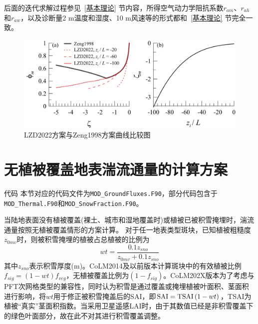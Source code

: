 后面的迭代求解过程参见~\ref{基本理论} 节内容，所得空气动力学阻抗系数$r_{am}$、$r_{ah}$和$r_{aw}$，以及诊断量2 m温度和湿度、10 m风速等的形式都和~\ref{基本理论} 节完全一致。
{
\begin{figure}[htbp]
\centering
\includegraphics[scale=0.7]{Figures/地表湍流交换过程/LZD2022方案与Zeng1998方案曲线比较图.png}
\caption{LZD2022方案与Zeng1998方案曲线比较图}
\label{fig:LZD2022方案与Zeng1998方案曲线比较图}
\end{figure}
}


\section{无植被覆盖地表湍流通量的计算方案}\label{无植被覆盖地表湍流通量的计算方案}
\begin{mymdframed}{代码}
本节对应的代码文件为\texttt{MOD\_GroundFluxes.F90}，部分代码包含于\texttt{MOD\_Thermal.F90}和\texttt{MOD\_SnowFraction.F90}。
\end{mymdframed}

当陆地表面没有植被覆盖(裸土、城市和湿地覆盖时)或植被已被积雪掩埋时，湍流通量按照无植被覆盖情形的方案计算。
对于任一地表类型斑块，已知植被粗糙度$z_{0mv}$时，则被积雪掩埋的植被占总植被的比例为
\begin{equation}
wt=\frac{0.1 z_{{sno}}}{z_{0mv}+0.1 z_{{sno}}}
\end{equation}
其中$z_{sno}$表示积雪厚度(m)。CoLM2014及以前版本计算斑块中的有效植被比例$f_{sig}=\left(1-wt\right)f_{veg}$，无植被覆盖比例为$\left(1-f_{sig}\right)$。CoLM202X版本为了考虑与PFT次网格类型的兼容性，同时认为积雪是通过覆盖或掩埋植被叶面积、茎面积进行影响，将$wt$用于修正被积雪掩盖后的SAI，即${\rm SAI=TSAI}\left(1-wt\right)$，TSAI为植被“真实”茎面积指数。当采用卫星遥感LAI时，由于其数值已经是非积雪覆盖下的绿色叶面部分，故在此不对其进行积雪覆盖调整。


